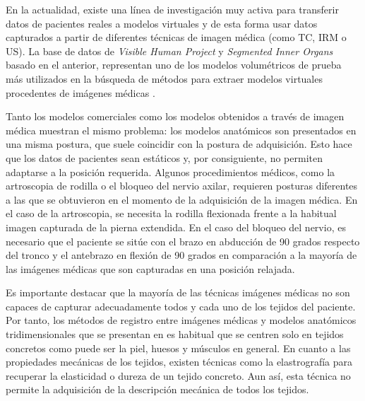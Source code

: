 En la actualidad, existe una línea de investigación muy activa para transferir datos de pacientes reales a modelos virtuales y de esta forma usar datos capturados a partir de diferentes técnicas de imagen médica (como \ac{TC}, \ac{IRM} o \ac{US}). La base de datos de  \emph{Visible Human Project}\cite{ackerman1998visible} y  \emph{Segmented Inner Organs}\cite{VoxelMan} basado en el anterior, representan uno de los modelos volumétricos de prueba más utilizados en la búsqueda de métodos para extraer modelos virtuales procedentes de imágenes médicas \cite{ferrante2017slice}.

Tanto los modelos comerciales como los modelos obtenidos a través de imagen médica muestran el mismo problema: los modelos anatómicos son presentados en una misma postura, que suele coincidir con la postura de adquisición. Esto hace que los datos de pacientes sean estáticos y, por consiguiente, no permiten adaptarse a la posición requerida. Algunos procedimientos médicos, como la artroscopia de rodilla o el bloqueo del nervio axilar, requieren posturas diferentes a las que se obtuvieron en el momento de la adquisición de la imagen médica. En el caso de la artroscopia, se necesita la rodilla flexionada frente a la habitual imagen capturada de la pierna extendida. En el caso del bloqueo del nervio, es necesario que el paciente se sitúe con el brazo en abducción de 90 grados respecto del tronco y el antebrazo en flexión de 90 grados en comparación a la mayoría de las imágenes médicas que son capturadas en una posición relajada. 

Es importante destacar que la mayoría de las técnicas imágenes médicas no son capaces de capturar adecuadamente todos y cada uno de los tejidos del paciente. Por tanto, los métodos de registro entre imágenes médicas y modelos anatómicos tridimensionales que se presentan en \cite{ferrante2017slice} es habitual que se centren solo en tejidos concretos como puede ser la piel, huesos y músculos en general. 
En cuanto a las propiedades mecánicas de los tejidos, existen técnicas como la elastrografía \cite{MRIelastography} para recuperar la elasticidad o dureza de un tejido concreto. Aun así, esta técnica no permite la adquisición de la descripción mecánica de todos los tejidos.





